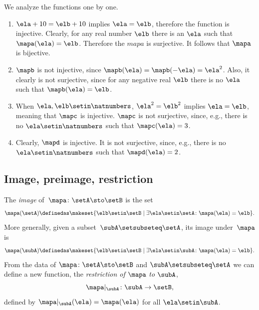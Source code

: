 \begin{solution}
    We analyze the functions one by one.
    \begin{enumerate}
        \item $\ela + 10 = \elb + 10$ implies $\ela=\elb$, therefore the function is injective.
              Clearly, for any real number $\elb$ there is an $\ela$ such that $\mapa(\ela)=\elb$.
              Therefore the $mapa$ is surjective.
              It follows that $\mapa$ is bijective.
        \item $\mapb$ is not injective, since $\mapb(\ela)=\mapb(-\ela)=\ela^2$.
              Also, it clearly is not surjective, since for any negative real $\elb$ there is no $\ela$ such that $\mapb(\ela)=\elb$.
        \item When $\ela,\elb \setin \natnumbers$, $\ela^2=\elb^2$ implies $\ela=\elb$, meaning that $\mapc$ is injective.
              $\mapc$ is not surjective, since, e.g., there is no $\ela\setin \natnumbers$ such that $\mapc(\ela)=3$.
        \item Clearly, $\mapd$ is injective.
              It is not surjective, since, e.g., there is no $\ela\setin \natnumbers$ such that $\mapd(\ela)=2$.
    \end{enumerate}
\end{solution}

\subsection{Image, preimage, restriction}

The \emph{image} of~$\mapa\colon \setA \sto \setB$ is the set
\begin{equation}
    \mapa(\setA) \definedas \makeset{ \elb \setin\setB \mid \exists \ela \setin\setA \colon \mapa(\ela) = \elb }.
\end{equation}
More generally, given a subset~$\subA \setsubseteq \setA$, its image under~$\mapa$ is
\begin{equation}
    \mapa(\subA) \definedas \makeset{ \elb \setin\setB \mid \exists \ela \setin\subA \colon \mapa(\ela) = \elb }.
\end{equation}
From the data of $\mapa\colon \setA \sto \setB$ and $\subA \setsubseteq \setA$ we can define a new function, the \emph{restriction of} $\mapa$ \emph{to} $\subA$,
\begin{equation}
    \mapa\vert_\subA \colon \subA \to \setB,
\end{equation}
defined by $\mapa\vert_\subA(\ela) = \mapa(\ela)$ for all $\ela \setin \subA$.

